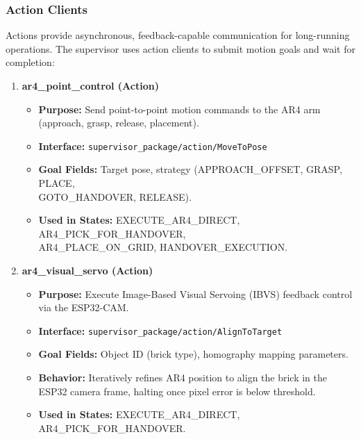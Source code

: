 \subsubsection{Action Clients}

Actions provide asynchronous, feedback-capable communication for long-running operations. The supervisor uses action clients to submit motion goals and wait for completion:

\begin{enumerate}
    \item \textbf{ar4\_point\_control (Action)}
    \begin{itemize}
        \item \textbf{Purpose:} Send point-to-point motion commands to the AR4 arm (approach, grasp, release, placement).
        \item \textbf{Interface:} \texttt{supervisor\_package/action/MoveToPose}
        \item \textbf{Goal Fields:} Target pose, strategy (APPROACH\_OFFSET, GRASP, PLACE, \\GOTO\_HANDOVER, RELEASE).
        \item \textbf{Used in States:} EXECUTE\_AR4\_DIRECT, AR4\_PICK\_FOR\_HANDOVER, \\AR4\_PLACE\_ON\_GRID, HANDOVER\_EXECUTION.
    \end{itemize}

    \item \textbf{ar4\_visual\_servo (Action)}
    \begin{itemize}
        \item \textbf{Purpose:} Execute Image-Based Visual Servoing (IBVS) feedback control via the ESP32-CAM.
        \item \textbf{Interface:} \texttt{supervisor\_package/action/AlignToTarget}
        \item \textbf{Goal Fields:} Object ID (brick type), homography mapping parameters.
        \item \textbf{Behavior:} Iteratively refines AR4 position to align the brick in the ESP32 camera frame, halting once pixel error is below threshold.
        \item \textbf{Used in States:} EXECUTE\_AR4\_DIRECT, AR4\_PICK\_FOR\_HANDOVER.
    \end{itemize}


\end{enumerate}
